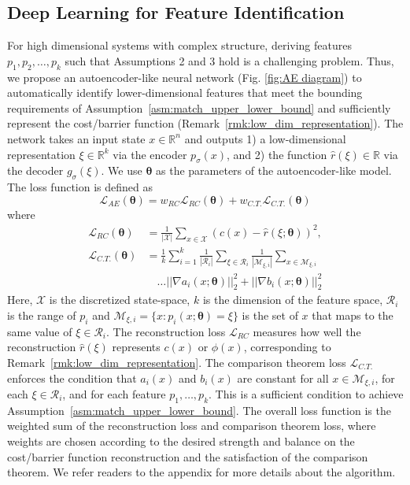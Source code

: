 \documentclass[letterpaper]{article} %
\begin{document}
\subsection{Deep Learning for Feature Identification}
For high dimensional systems with complex structure, deriving features $p_1, p_2, \ldots, p_k$ such that Assumptions 2 and 3 hold is a challenging problem.  Thus, we propose an autoencoder-like neural network (Fig. \ref{fig:AE diagram}) to automatically identify lower-dimensional features that meet the bounding  requirements of Assumption~\ref{asm:match_upper_lower_bound} and sufficiently represent the cost/barrier function (Remark~\ref{rmk:low_dim_representation}). The network takes an input state $x\in\mathbb{R}^n$ and outputs 1) a low-dimensional representation $\xi\in\mathbb{R}^k$ via the encoder $p_\sigma(x)$, and 2) the function $\hat{r}(\xi)\in\mathbb{R}$ via the decoder $g_\sigma(\xi)$. We use $\boldsymbol \theta$ as the parameters of the autoencoder-like model. The loss function is defined as
\begin{equation}\label{eq: AE Loss}
    \mathcal{L}_{AE}(\boldsymbol\theta) = w_{RC}\mathcal{L}_{RC}(\boldsymbol\theta) + w_{C.T.}\mathcal{L}_{C.T.}(\boldsymbol\theta)
\end{equation}
where
\begin{align}
    \mathcal{L}_{RC}(\boldsymbol\theta) &= \frac{1}{|\mathcal{X}|}\sum_{x\in\mathcal{X}}\left(c(x)-\hat{r}(\xi; \boldsymbol\theta)\right)^2, \label{eq: RC loss} \\
    \mathcal{L}_{C.T.}(\boldsymbol\theta) &= \frac{1}{k}\sum_{i=1}^k\frac{1}{|\mathcal{R}_i|}\sum_{\xi\in\mathcal{R}_i}\frac{1}{|\mathcal{M}_{\xi, i}|}\sum_{x\in\mathcal{M}_{\xi, i}} \label{eq: CT loss} \\
    & \quad \ldots ||\nabla a_i(x; \boldsymbol\theta) ||_2^2 + || \nabla b_i(x; \boldsymbol\theta)||_2^2 \nonumber
\end{align}
Here, $\mathcal{X}$ is the discretized state-space, $k$ is the dimension of the feature space, $\mathcal{R}_i$ is the range of $p_i$ and $\mathcal{M}_{\xi, i}=\{x: p_i(x; \boldsymbol\theta)=\xi\}$ is the set of $x$ that maps to the same value of $\xi\in\mathcal{R}_i$. The reconstruction loss $\mathcal{L}_{RC}$ measures how well the reconstruction $\hat{r}(\xi)$ represents $c(x)$ or $\phi(x)$, corresponding to Remark~\ref{rmk:low_dim_representation}. The comparison theorem loss $\mathcal{L}_{C.T.}$ enforces the condition that $a_i(x)$ and $b_i(x)$ are constant for all $x\in \mathcal{M}_{\xi, i}$, for each $\xi\in\mathcal{R}_i$, and for each feature $p_1,\ldots,p_k$. This is a sufficient condition to achieve Assumption~\ref{asm:match_upper_lower_bound}. The overall loss function is the weighted sum of the reconstruction loss and comparison theorem loss, where weights are chosen according to the desired strength and balance on the cost/barrier function reconstruction and the satisfaction of the comparison theorem. We refer readers to the appendix for more details about the algorithm.
\end{document}
